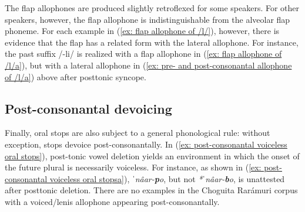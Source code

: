                         \label{ex: flap allophone of /l/f}
                            \label{ex: flap allophone of /l/g}
                                \label{ex: flap allophone of /l/h}

    \z
\z

The flap allophones are produced slightly retroflexed for some speakers. For other speakers, however, the flap allophone is indistinguishable from the alveolar flap phoneme. For each example in (\ref{ex: flap allophone of /l/}), however, there is evidence that the flap has a related form with the lateral allophone. For instance, the past suffix /{}-li/ is realized with a flap allophone in (\ref{ex: flap allophone of /l/a}), but with a lateral allophone in (\ref{ex: pre- and post-consonantal allophone of /l/a}) above after posttonic syncope.

\subsection{Post-consonantal devoicing}
\label{subsec: post-consonantal devoicing}

Finally, oral stops are also subject to a general phonological rule: without exception, stops devoice post-consonantally. In (\ref{ex: post-consonantal voiceless oral stops}), post-tonic vowel deletion yields an environment in which the onset of the future plural is necessarily voiceless. For instance,  as shown in (\ref{ex: post-consonantal voiceless oral stopsa}), \textit{ˈnâar-}\textbf{\textit{p}}\textit{o}, but not \textit{*ˈnâar-}\textbf{\textit{b}}\textit{o}, is unattested after posttonic deletion. There are no examples in the Choguita Rarámuri corpus with a voiced/lenis allophone appearing post-consonantally.

